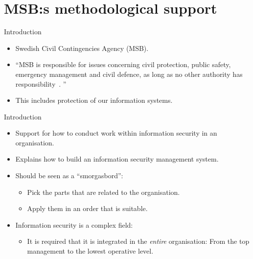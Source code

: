 \documentclass{beamer}
\begin{document}
\section[Methodilogical support]{MSB:s methodological support}
\begin{frame}{Introduction}{\insertsectionhead}
  \begin{itemize}
    \item Swedish Civil Contingencies Agency (MSB).
    \item \enquote{MSB is responsible for issues concerning civil protection,
        public safety, emergency management and civil defence, as long as no
        other authority has responsibility~\cite[About MSB]{msbse}\@.
        }
    \item This includes protection of our information systems.
  \end{itemize}
\end{frame}

\begin{frame}{Introduction}{\insertsectionhead}
  \begin{itemize}
    \item Support for how to conduct work within information security in an
      organisation.

    \item Explains how to build an information security management system.

    \item Should be seen as a \enquote{smorgasbord}:
      \begin{itemize}
        \item Pick the parts that are related to the organisation.
        \item Apply them in an order that is suitable.
      \end{itemize}

    \item Information security is a complex field:
      \begin{itemize}
        \item It is required that it is integrated in the \emph{entire}
          organisation: From the top management to the lowest operative level.
      \end{itemize}

  \end{itemize}
\end{frame}
\end{document}
